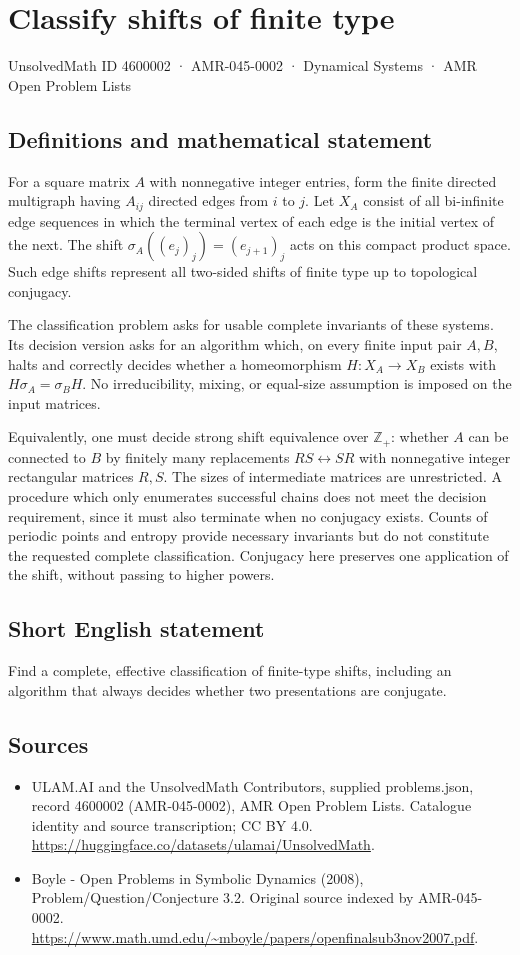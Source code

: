 \documentclass[11pt,a4paper]{article}
\begin{document}
\section*{Classify shifts of finite type}\label{4600002}
{\small UnsolvedMath ID 4600002 · AMR-045-0002 · Dynamical Systems · AMR Open Problem Lists}
\subsection{Definitions and mathematical statement}
For a square matrix $A$ with nonnegative integer entries, form the finite
directed multigraph having $A_{ij}$ directed edges from $i$ to $j$. Let
$X_A$ consist of all bi-infinite edge sequences in which the terminal
vertex of each edge is the initial vertex of the next. The shift
$\sigma_A((e_j)_j)=(e_{j+1})_j$ acts on this compact product space.
Such edge shifts represent all two-sided shifts of finite type up to
topological conjugacy.

The classification problem asks for usable complete invariants of these
systems. Its decision version asks for an algorithm which, on every finite
input pair $A,B$, halts and correctly decides whether a homeomorphism
$H:X_A\to X_B$ exists with $H\sigma_A=\sigma_BH$. No irreducibility,
mixing, or equal-size assumption is imposed on the input matrices.

Equivalently, one must decide strong shift equivalence over $\mathbb Z_+$:
whether $A$ can be connected to $B$ by finitely many replacements
$RS\leftrightarrow SR$ with nonnegative integer rectangular matrices $R,S$.
The sizes of intermediate matrices are unrestricted. A procedure which only
enumerates successful chains does not meet the decision requirement, since
it must also terminate when no conjugacy exists. Counts of periodic points
and entropy provide necessary invariants but do not constitute the requested
complete classification. Conjugacy here preserves one application of the
shift, without passing to higher powers.
\subsection{Short English statement}
Find a complete, effective classification of finite-type shifts, including an algorithm that always decides whether two presentations are conjugate.
\subsection{Sources}
\begin{itemize}
\item[S1] ULAM.AI and the UnsolvedMath Contributors, supplied problems.json, record 4600002 (AMR-045-0002), AMR Open Problem Lists. Catalogue identity and source transcription; CC BY 4.0.
\url{https://huggingface.co/datasets/ulamai/UnsolvedMath}.
\item[S2] Boyle - Open Problems in Symbolic Dynamics (2008), Problem/Question/Conjecture 3.2. Original source indexed by AMR-045-0002.
\url{https://www.math.umd.edu/~mboyle/papers/openfinalsub3nov2007.pdf}.
\end{itemize}
\end{document}
